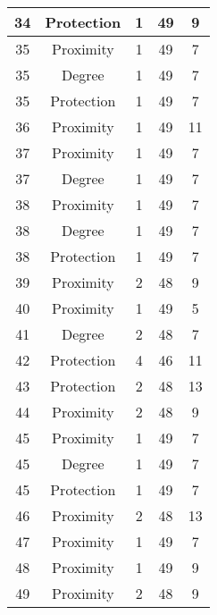 \documentclass[results.tex]{subfiles}
\begin{document}
\begin{center}
\begin{tabular}{| c || c | c | c | c |}
    \hline
    34 & Protection & 1 & 49 & 9 \\ 
    \hline
    35 & Proximity & 1 & 49 & 7 \\ 
    \hline
    35 & Degree & 1 & 49 & 7 \\ 
    \hline
    35 & Protection & 1 & 49 & 7 \\ 
    \hline
    36 & Proximity & 1 & 49 & 11 \\ 
    \hline
    37 & Proximity & 1 & 49 & 7 \\ 
    \hline
    37 & Degree & 1 & 49 & 7 \\ 
    \hline
    38 & Proximity & 1 & 49 & 7 \\ 
    \hline
    38 & Degree & 1 & 49 & 7 \\ 
    \hline
    38 & Protection & 1 & 49 & 7 \\ 
    \hline
    39 & Proximity & 2 & 48 & 9 \\ 
    \hline
    40 & Proximity & 1 & 49 & 5 \\ 
    \hline
    41 & Degree & 2 & 48 & 7 \\ 
    \hline
    42 & Protection & 4 & 46 & 11 \\ 
    \hline
    43 & Protection & 2 & 48 & 13 \\ 
    \hline
    44 & Proximity & 2 & 48 & 9 \\ 
    \hline
    45 & Proximity & 1 & 49 & 7 \\ 
    \hline
    45 & Degree & 1 & 49 & 7 \\ 
    \hline
    45 & Protection & 1 & 49 & 7 \\ 
    \hline
    46 & Proximity & 2 & 48 & 13 \\ 
    \hline
    47 & Proximity & 1 & 49 & 7 \\ 
    \hline
    48 & Proximity & 1 & 49 & 9 \\ 
    \hline
    49 & Proximity & 2 & 48 & 9 \\ 
    \hline   \end{tabular}
\end{center}
\end{document}
